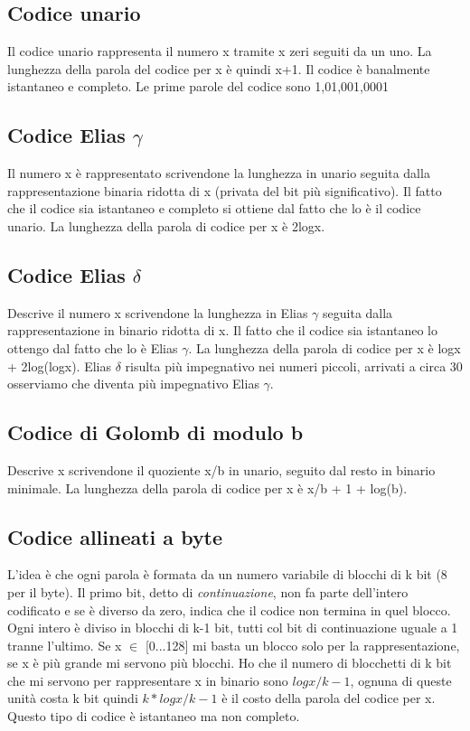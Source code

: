 \documentclass[12pt,italian]{report}
\begin{document}
\subsection{Codice unario}
\label{codiceunario} 
Il codice unario rappresenta il numero x tramite x zeri seguiti da un uno. La lunghezza della parola del codice per x è quindi x+1. Il codice è banalmente istantaneo e completo. Le prime parole del codice sono 1,01,001,0001
\vspace{50mm}

\subsection{Codice Elias $ \gamma $ }
\label{codiceeliasgamma} 
Il numero x è rappresentato scrivendone la lunghezza in unario seguita dalla rappresentazione binaria ridotta di x (privata del bit più significativo). Il fatto che il codice sia istantaneo e completo si ottiene dal fatto che lo è il codice unario. La lunghezza della parola di codice per x è 2logx.
\vspace{50mm}

\subsection{Codice Elias $ \delta $ }
\label{codiceeliasdelta} 
Descrive il numero x scrivendone la lunghezza in Elias $\gamma$ seguita dalla rappresentazione in binario ridotta di x. Il fatto che il codice sia istantaneo lo ottengo dal fatto che lo è Elias $\gamma$. La lunghezza della parola di codice per x è logx + 2log(logx).
Elias $\delta$ risulta più impegnativo nei numeri piccoli, arrivati a circa 30 osserviamo che diventa più impegnativo Elias $\gamma$.
\vspace{50mm}

\subsection{Codice di Golomb di modulo b}
\label{codicegolomb} 
Descrive x scrivendone il quoziente x/b in unario, seguito dal resto in binario minimale. La lunghezza della parola di codice per x è x/b + 1 + log(b).
\vspace{40mm}

\subsection{Codice allineati a byte}
\label{codiciallineati} 
L'idea è che ogni parola è formata da un numero variabile di blocchi di k bit (8 per il byte). Il primo bit, detto di \textit{continuazione}, non fa parte dell'intero codificato e se è diverso da zero, indica che il codice non termina in quel blocco.
Ogni intero è diviso in blocchi di k-1 bit, tutti col bit di continuazione uguale a 1 tranne l'ultimo. Se x $\in$ [0...128] mi basta un blocco solo per la rappresentazione, se x è più grande mi servono più blocchi. Ho che il numero di blocchetti di k bit che mi servono per rappresentare x in binario sono $logx/k-1$, ognuna di queste unità costa k bit quindi $k* logx/k-1$ è il costo della parola del codice per x. Questo tipo di codice è istantaneo ma non completo.
\vspace{50mm}
\end{document}
